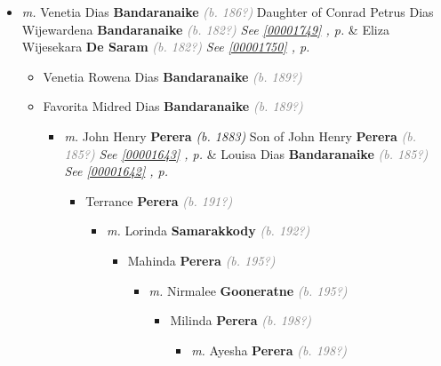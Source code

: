 \documentclass[10pt, openany]{book}
\begin{document}
\begin{itemize}
{\begin{itemize}
{\begin{itemize}
{\begin{itemize}
{\begin{itemize}
\item{\textit{m.} Venetia Dias \textbf{Bandaranaike} \textcolor{gray}{\textit{(b. 186?)}} Daughter of  Conrad Petrus  Dias Wijewardena \textbf{Bandaranaike} \textcolor{gray}{\textit{(b. 182?)}} \textcolor{slteal}{\textit{See  \autoref{00001749} \textit{, p. \pageref{00001749} }}}  \&  Eliza Wijesekara \textbf{De Saram} \textcolor{gray}{\textit{(b. 182?)}} \textcolor{slteal}{\textit{See  \autoref{00001750} \textit{, p. \pageref{00001750} }}}   \label{couple:00001809:00001810} \begin{itemize}
\item{Venetia Rowena Dias \textbf{Bandaranaike} \textcolor{gray}{\textit{(b. 189?)}}
   }
\item{Favorita Midred Dias \textbf{Bandaranaike} \textcolor{gray}{\textit{(b. 189?)}}
\begin{itemize}
\item{\textit{m.} John Henry \textbf{Perera} \textcolor{slorange}{\textit{(b. 1883)}} Son of  John Henry \textbf{Perera} \textcolor{gray}{\textit{(b. 185?)}} \textcolor{slteal}{\textit{See  \autoref{00001643} \textit{, p. \pageref{00001643} }}}  \&  Louisa Dias \textbf{Bandaranaike} \textcolor{gray}{\textit{(b. 185?)}} \textcolor{slteal}{\textit{See  \autoref{00001642} \textit{, p. \pageref{00001642} }}}   \label{couple:00001644:00001645} \begin{itemize}
\item{Terrance \textbf{Perera} \textcolor{gray}{\textit{(b. 191?)}}
\begin{itemize}
\item{\textit{m.} Lorinda \textbf{Samarakkody} \textcolor{gray}{\textit{(b. 192?)}}   \label{couple:00001647:00001648} \begin{itemize}
\item{Mahinda \textbf{Perera} \textcolor{gray}{\textit{(b. 195?)}}
\begin{itemize}
\item{\textit{m.} Nirmalee \textbf{Gooneratne} \textcolor{gray}{\textit{(b. 195?)}}   \label{couple:00001649:00001650} \begin{itemize}
\item{Milinda \textbf{Perera} \textcolor{gray}{\textit{(b. 198?)}}
\begin{itemize}
\item{\textit{m.} Ayesha \textbf{Perera} \textcolor{gray}{\textit{(b. 198?)}}   \label{couple:00001651:00001652} \begin{itemize}

\end{itemize}}
\end{itemize}}
\end{itemize}}
\end{itemize}}
\end{itemize}}
\end{itemize}}
\end{itemize}}
\end{itemize}}
\end{itemize}}
\end{itemize}}
\end{itemize}}
\end{itemize}}
\end{itemize}}
\end{itemize}
\end{document}
